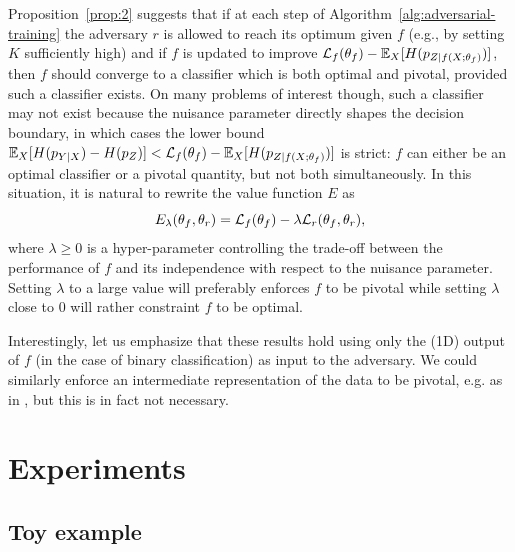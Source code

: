 \documentclass[twocolumn,superscriptaddress,aps]{revtex4-1}
\theoremstyle{plain}
\begin{document}
Proposition~\ref{prop:2} suggests that if at each step of
Algorithm~\ref{alg:adversarial-training} the adversary $r$ is allowed to reach
its optimum given $f$ (e.g., by setting $K$ sufficiently high) and if $f$ is
updated to improve ${\cal L}_f(\theta_f) - \mathbb{E}_X [ H(p_{Z|f(X;\theta_f)}) ]$, then $f$
should converge to a classifier which is both optimal and pivotal, provided such
a classifier exists. On many problems of interest though, such a classifier may
not exist because the nuisance parameter directly shapes the decision boundary,
in which cases the lower bound $\mathbb{E}_{X} [ H(p_{Y|X}) - H(p_Z)] < {\cal L}_f(\theta_f) - \mathbb{E}_{X} [H(p_{Z|f(X;\theta_f)})]$ is strict: $f$ can either be an optimal classifier or a
pivotal quantity, but not both simultaneously. In this situation, it is natural
to rewrite the value function $E$  as
\begin{equation}
    E_\lambda(\theta_f, \theta_r) = {\cal L}_f(\theta_f) - \lambda {\cal L}_r(\theta_f, \theta_r),
\end{equation}
where $\lambda \geq 0$ is a hyper-parameter controlling the trade-off between
the performance of $f$ and its independence with respect to the nuisance
parameter. Setting $\lambda$ to a large value will preferably enforces $f$ to
be pivotal while setting $\lambda$ close to $0$ will rather constraint $f$ to be
optimal.

Interestingly, let us emphasize that these results hold using only the (1D) output
of $f$ (in the case of binary classification) as input to the adversary. We
could similarly enforce an intermediate representation of the data to be
pivotal, e.g. as in \citep{ganin2014unsupervised}, but this is in fact not
necessary.



\section{Experiments}

\subsection{Toy example}
\label{sec:toy}
\end{document}
